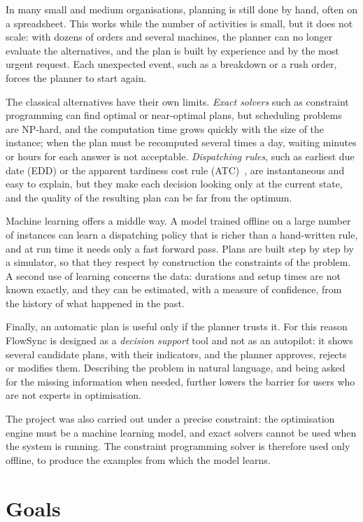 In many small and medium organisations, planning is still done by hand, often on a spreadsheet.
This works while the number of activities is small, but it does not scale: with dozens of orders
and several machines, the planner can no longer evaluate the alternatives, and the plan is built
by experience and by the most urgent request. Each unexpected event, such as a breakdown or a
rush order, forces the planner to start again.

The classical alternatives have their own limits. \emph{Exact solvers} such as constraint
programming can find optimal or near-optimal plans, but scheduling problems are NP-hard, and the
computation time grows quickly with the size of the instance; when the plan must be recomputed
several times a day, waiting minutes or hours for each answer is not acceptable.
\emph{Dispatching rules}, such as earliest due date (EDD) or the apparent tardiness cost
rule (ATC)~\cite{vepsalainen1987}, are instantaneous and easy to explain, but they make each
decision looking only at the current state, and the quality of the resulting plan can be far from
the optimum.

Machine learning offers a middle way. A model trained offline on a large number of instances
can learn a dispatching policy that is richer than a hand-written rule, and at run time it
needs only a fast forward pass. Plans are built step by step by a simulator, so that they respect
by construction the constraints of the problem. A second use of learning concerns the data:
durations and setup times are not known exactly, and they can be estimated, with a measure of
confidence, from the history of what happened in the past.

Finally, an automatic plan is useful only if the planner trusts it. For this reason FlowSync is
designed as a \emph{decision support} tool and not as an autopilot: it shows several candidate
plans, with their indicators, and the planner approves, rejects or modifies them. Describing the
problem in natural language, and being asked for the missing information when needed, further
lowers the barrier for users who are not experts in optimisation.

The project was also carried out under a precise constraint: the optimisation engine must be a
machine learning model, and exact solvers cannot be used when the system is running. The
constraint programming solver is therefore used only offline, to produce the examples from which
the model learns.

\section{Goals}
\label{sec:goals}

